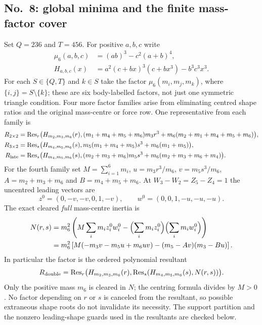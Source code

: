 \documentclass[11pt]{amsart}
\theoremstyle{remark}
\begin{document}
\subsection{No.~8: global minima and the finite mass-factor cover}
Set $Q=236$ and $T=456$. For positive $a,b,c$ write
\begin{equation}\label{eq:no8-triangle-factors}
\begin{aligned}
\mu_6(a,b,c)&=(ab)^3-c^2(a+b)^4,\\
H_{a,b,c}(x)&=a^2(c+bx)^3(c+bx^3)-b^3c^3x^3.
\end{aligned}
\end{equation}
For each $S\in\{Q,T\}$ and $k\in S$ take the factor $\mu_6(m_i,m_j,m_k)$, where $\{i,j\}=S\setminus\{k\}$; these are six body-labelled factors, not just one symmetric triangle condition. Four more factor families arise from eliminating centred shape ratios and the original mass-centre or force row. One representative from each family is
\begin{align}
R_{2\times2}&=\operatorname{Res}_r\bigl(H_{m_2,m_3,m_6}(r),(m_1+m_4+m_5+m_6)m_3r^3+m_6(m_2+m_1+m_4+m_5+m_6)\bigr),\label{eq:no8-R22}\\
R_{3\times2}&=\operatorname{Res}_s\bigl(H_{m_4,m_5,m_6}(s),m_5(m_1+m_4+m_5)s^3+m_6(m_1+m_5)\bigr),\label{eq:no8-R32}\\
R_{\rm late}&=\operatorname{Res}_s\bigl(H_{m_4,m_5,m_6}(s),(m_2+m_3+m_6)m_5s^3+m_6(m_2+m_3+m_6+m_4)\bigr).\label{eq:no8-Rlate}
\end{align}
For the fourth family set $M=\sum_{i=1}^6m_i$, $u=m_3r^3/m_6$, $v=m_5s^3/m_6$, $A=m_2+m_3+m_6$ and $B=m_4+m_5+m_6$. At $W_3-W_2=Z_5-Z_4=1$ the uncentred leading vectors are
\[
z^0=(0,-v,-v,0,1,-v),\qquad w^0=(0,0,1,-u,-u,-u).
\]
The exact cleared \emph{full} mass-centre inertia is
\begin{equation}\label{eq:no8-double-numerator}
\begin{aligned}
N(r,s)&=m_6^2\left(M\sum_i m_i z_i^0w_i^0-\Bigl(\sum_i m_iz_i^0\Bigr)\Bigl(\sum_i m_iw_i^0\Bigr)\right)\\
&=m_6^2\left[M(-m_3v-m_5u+m_6uv)-(m_5-Av)(m_3-Bu)\right].
\end{aligned}
\end{equation}
In particular the factor is the ordered polynomial resultant
\begin{equation}\label{eq:no8-Rdouble}
R_{\rm double}=\operatorname{Res}_r\bigl(H_{m_2,m_3,m_6}(r),\operatorname{Res}_s(H_{m_4,m_5,m_6}(s),N(r,s))\bigr).
\end{equation}
Only the positive mass $m_6$ is cleared in $N$; the centring formula divides by $M>0$. No factor depending on $r$ or $s$ is canceled from the resultant, so possible extraneous shape roots do not invalidate its necessity. The support partition and the nonzero leading-shape guards used in the resultants are checked below.
\end{document}
